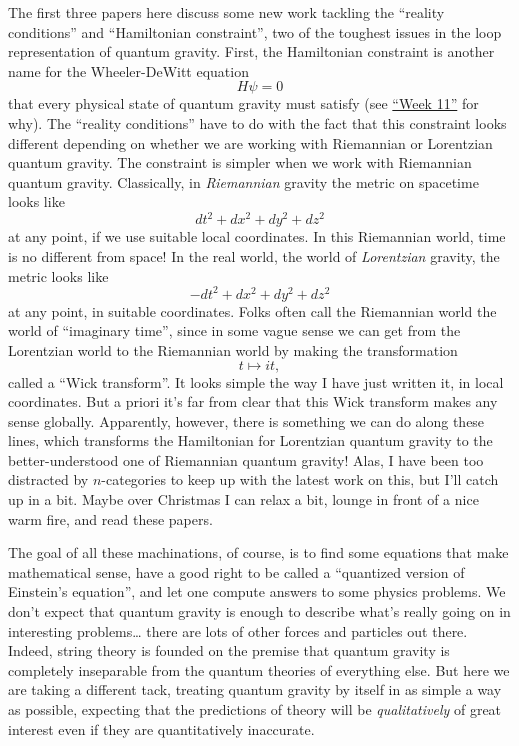 \documentclass{article}
\begin{document}
The first three papers here discuss some new work tackling the ``reality
conditions'' and ``Hamiltonian constraint'', two of the toughest issues
in the loop representation of quantum gravity. First, the Hamiltonian
constraint is another name for the Wheeler-DeWitt equation
\[H \psi = 0\] that every physical state of quantum gravity must satisfy
(see \protect\hyperlink{week11}{``Week 11''} for why). The ``reality
conditions'' have to do with the fact that this constraint looks
different depending on whether we are working with Riemannian or
Lorentzian quantum gravity. The constraint is simpler when we work with
Riemannian quantum gravity. Classically, in \emph{Riemannian} gravity
the metric on spacetime looks like \[dt^2 + dx^2 + dy^2 + dz^2\] at any
point, if we use suitable local coordinates. In this Riemannian world,
time is no different from space! In the real world, the world of
\emph{Lorentzian} gravity, the metric looks like
\[-dt^2 + dx^2 + dy^2 + dz^2\] at any point, in suitable coordinates.
Folks often call the Riemannian world the world of ``imaginary time'',
since in some vague sense we can get from the Lorentzian world to the
Riemannian world by making the transformation \[t \mapsto it,\] called a
``Wick transform''. It looks simple the way I have just written it, in
local coordinates. But a priori it's far from clear that this Wick
transform makes any sense globally. Apparently, however, there is
something we can do along these lines, which transforms the Hamiltonian
for Lorentzian quantum gravity to the better-understood one of
Riemannian quantum gravity! Alas, I have been too distracted by
\(n\)-categories to keep up with the latest work on this, but I'll catch
up in a bit. Maybe over Christmas I can relax a bit, lounge in front of
a nice warm fire, and read these papers.

The goal of all these machinations, of course, is to find some equations
that make mathematical sense, have a good right to be called a
``quantized version of Einstein's equation'', and let one compute
answers to some physics problems. We don't expect that quantum gravity
is enough to describe what's really going on in interesting
problems\ldots{} there are lots of other forces and particles out there.
Indeed, string theory is founded on the premise that quantum gravity is
completely inseparable from the quantum theories of everything else. But
here we are taking a different tack, treating quantum gravity by itself
in as simple a way as possible, expecting that the predictions of theory
will be \emph{qualitatively} of great interest even if they are
quantitatively inaccurate.
\end{document}
